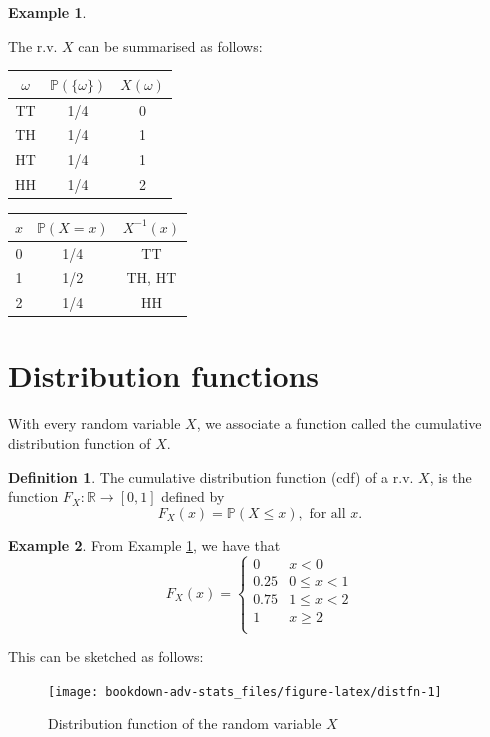 \documentclass[
]{book}
\newcommand{\bbR}{\mathbb{R}}
\newcommand{\bbP}{\mathbb{P}}
\theoremstyle{definition}
\newtheorem{definition}{Definition}[chapter]
\theoremstyle{definition}
\newtheorem{example}{Example}[chapter]
\theoremstyle{definition}
\theoremstyle{definition}
\theoremstyle{remark}
\begin{document}
\begin{example}
\protect\hypertarget{exm:coinflip}{}\label{exm:coinflip}

The r.v. \(X\) can be summarised as follows:

\begin{longtable}[]{@{}ccc@{}}
\toprule
\(\omega\) & \(\bbP(\{\omega\})\) & \(X(\omega)\) \\
\midrule
\endhead
TT & 1/4 & 0 \\
TH & 1/4 & 1 \\
HT & 1/4 & 1 \\
HH & 1/4 & 2 \\
\bottomrule
\end{longtable}

\begin{longtable}[]{@{}ccc@{}}
\toprule
\(x\) & \(\bbP(X = x)\) & \(X^{-1}(x)\) \\
\midrule
\endhead
0 & 1/4 & TT \\
1 & 1/2 & TH, HT \\
2 & 1/4 & HH \\
\bottomrule
\end{longtable}

\end{example}

\hypertarget{distribution-functions}{%
\section{Distribution functions}\label{distribution-functions}}

With every random variable \(X\), we associate a function called the cumulative distribution function of \(X\).

\begin{definition}
The cumulative distribution function (cdf) of a r.v. \(X\), is the function \(F_X:\bbR\to[0,1]\) defined by
\[
  F_X(x) = \bbP(X \leq x), \text{ for all } x.
\]
\end{definition}

\begin{example}

From Example \ref{exm:coinflip}, we have that
\[
F_X(x)=
\begin{cases}
0   &x < 0 \\
0.25  &0 \leq x < 1 \\
0.75  &1 \leq x < 2 \\
1  &x \geq 2 \\
\end{cases}
\]

This can be sketched as follows:

\begin{figure}

{\centering \texttt{[image: bookdown-adv-stats\_files/figure-latex/distfn-1]} 

}

\caption{Distribution function of the random variable $X$}\label{fig:distfn}
\end{figure}

\end{example}
\end{document}
